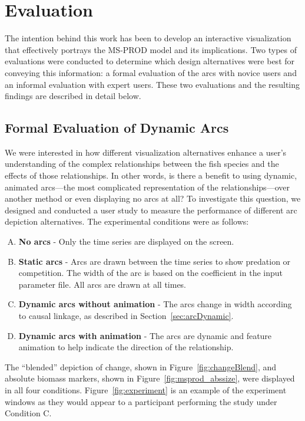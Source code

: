 \chapter{Evaluation}

The intention behind this work has been to develop an interactive visualization that effectively portrays the MS-PROD model and its implications.  Two types of evaluations were conducted to determine which design alternatives were best for conveying this information: a formal evaluation of the arcs with novice users and an informal evaluation with expert users.  These two evaluations and the resulting findings are described in detail below. 

\section{Formal Evaluation of Dynamic Arcs}

We were interested in how different visualization alternatives enhance a user's understanding of the complex relationships between the fish species and the effects of those relationships.  In other words, is there a benefit to using dynamic, animated arcs---the most complicated representation of the relationships---over another method or even displaying no arcs at all?  To investigate this question, we designed and conducted a user study to measure the performance of different arc depiction alternatives.  The experimental conditions were as follows:
\begin{enumerate}[(A)]
\item \textbf{No arcs} - Only the time series are displayed on the screen. 
\item \textbf{Static arcs} - Arcs are drawn between the time series to show predation or competition.  The width of the arc is based on the coefficient in the input parameter file.  All arcs are drawn at all times.
\item \textbf{Dynamic arcs without animation} - The arcs change in width according to causal linkage, as described in Section~\ref{sec:arcDynamic}.
\item \textbf{Dynamic arcs with animation} - The arcs are dynamic and feature animation to help indicate the direction of the relationship.
\end{enumerate}
The ``blended'' depiction of change, shown in Figure~\ref{fig:changeBlend}, and absolute biomass markers, shown in Figure~\ref{fig:msprod_abssize}, were displayed in all four conditions.  Figure~\ref{fig:experiment} is an example of the experiment windows as they would appear to a participant performing the study under Condition C.

